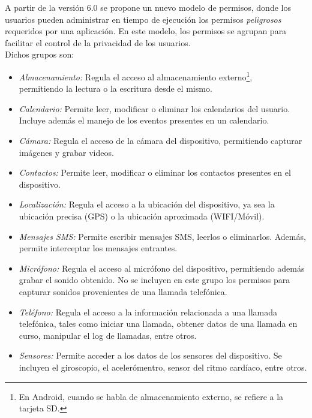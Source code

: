 A partir de la versión 6.0 se propone un nuevo modelo de permisos, donde los usuarios pueden administrar en tiempo de ejecución los permisos \emph{peligrosos} requeridos por una aplicación. En este modelo, los permisos se agrupan para facilitar el control de la privacidad de los usuarios.\\

Dichos grupos son:
\begin{itemize}
    \item \emph{Almacenamiento:} Regula el acceso al almacenamiento externo\footnote{En Android, cuando se habla de almacenamiento externo, se refiere a la tarjeta SD.}, \\permitiendo la lectura o la escritura desde el mismo.
    \item \emph{Calendario:} Permite leer, modificar o eliminar los calendarios del usuario. Incluye además el manejo de los eventos presentes en un calendario.
    \item \emph{Cámara:} Regula el acceso de la cámara del dispositivo, permitiendo capturar imágenes y grabar videos.
    \item \emph{Contactos:} Permite leer, modificar o eliminar los contactos presentes en el dispositivo.
    \item \emph{Localización:} Regula el acceso a la ubicación del dispositivo, ya sea la ubicación precisa (GPS) o la ubicación aproximada (WIFI/Móvil).
    \item \emph{Mensajes SMS:} Permite escribir mensajes SMS, leerlos o eliminarlos. Además, permite interceptar los mensajes entrantes.
    \item \emph{Micrófono:} Regula el acceso al micrófono del dispositivo, permitiendo además grabar el sonido obtenido. No se incluyen en este grupo los permisos para capturar sonidos provenientes de una llamada telefónica.
    \item \emph{Teléfono:} Regula el acceso a la información relacionada a una llamada telefónica, tales como iniciar una llamada, obtener datos de una llamada en curso, manipular el log de llamadas, entre otros.
    \item \emph{Sensores:} Permite acceder a los datos de los sensores del dispositivo. Se incluyen el giroscopio, el acelerómentro, sensor del ritmo cardíaco, entre otros.
\end{itemize}

